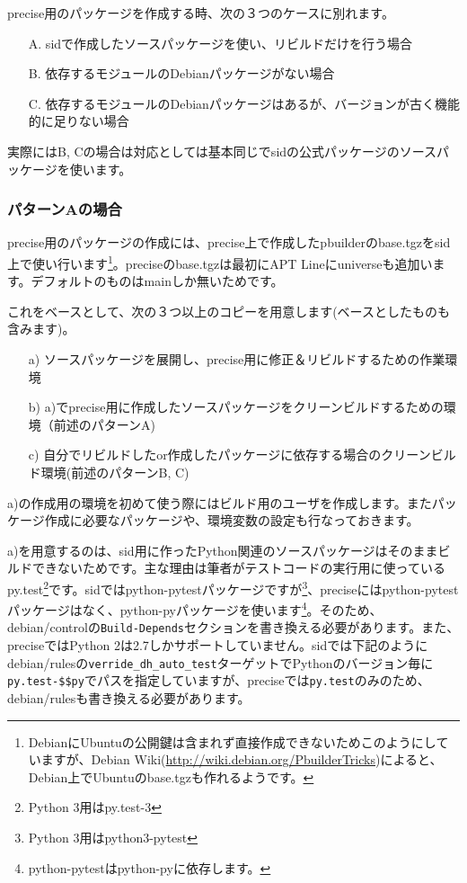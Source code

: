 \documentclass[mingoth,a4paper,twoside]{jsarticle}
\begin{document}
precise用のパッケージを作成する時、次の３つのケースに別れます。

\begin{itemize}
\item[A.] sidで作成したソースパッケージを使い、リビルドだけを行う場合
\item[B.] 依存するモジュールのDebianパッケージがない場合
\item[C.] 依存するモジュールのDebianパッケージはあるが、バージョンが古く機能的に足りない場合
\end{itemize}

実際にはB, Cの場合は対応としては基本同じでsidの公式パッケージのソースパッケージを使います。

\subsubsection{パターンAの場合}

precise用のパッケージの作成には、precise上で作成したpbuilderのbase.tgzをsid上で使い行います\footnote{DebianにUbuntuの公開鍵は含まれず直接作成できないためこのようにしていますが、Debian Wiki(\url{http://wiki.debian.org/PbuilderTricks})によると、Debian上でUbuntuのbase.tgzも作れるようです。}。preciseのbase.tgzは最初にAPT Lineにuniverseも追加います。デフォルトのものはmainしか無いためです。


これをベースとして、次の３つ以上のコピーを用意します(ベースとしたものも含みます)。

\begin{itemize}
\item[a)] ソースパッケージを展開し、precise用に修正＆リビルドするための作業環境
\item[b)] a)でprecise用に作成したソースパッケージをクリーンビルドするための環境（前述のパターンA)
\item[c)] 自分でリビルドしたor作成したパッケージに依存する場合のクリーンビルド環境(前述のパターンB, C)
\end{itemize}

a)の作成用の環境を初めて使う際にはビルド用のユーザを作成します。またパッケージ作成に必要なパッケージや、環境変数の設定も行なっておきます。

a)を用意するのは、sid用に作ったPython関連のソースパッケージはそのままビルドできないためです。主な理由は筆者がテストコードの実行用に使っているpy.test\footnote{Python 3用はpy.test-3}です。sidではpython-pytestパッケージですが\footnote{Python 3用はpython3-pytest}、preciseにはpython-pytestパッケージはなく、python-pyパッケージを使います\footnote{python-pytestはpython-pyに依存します。}。そのため、debian/controlの\texttt{Build-Depends}セクションを書き換える必要があります。また、preciseではPython 2は2.7しかサポートしていません。sidでは下記のようにdebian/rulesの\texttt{verride\_dh\_auto\_test}ターゲットでPythonのバージョン毎に\texttt{py.test-\$\$py}でパスを指定していますが、preciseでは\texttt{py.test}のみのため、debian/rulesも書き換える必要があります。
\end{document}
